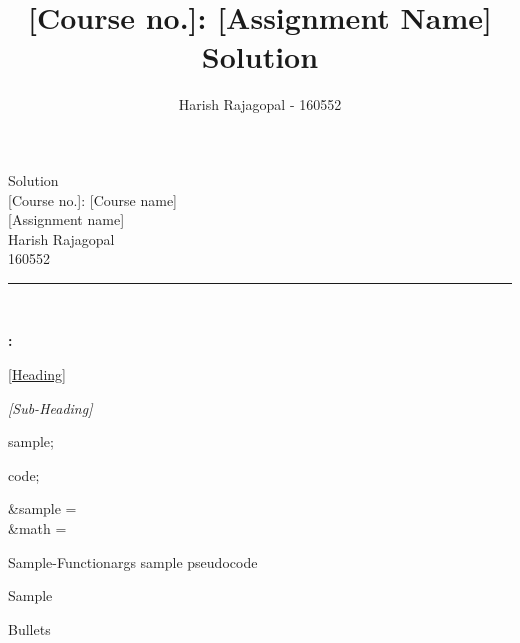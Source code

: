 \documentclass[11pt]{article}
\title{[Course no.]: [Assignment Name] Solution}
\author{Harish Rajagopal - 160552}
\begin{document}
    \setlength{\voffset}{-2mm}
    \setlength{\footskip}{35pt}

    \begin{center}
        \selectfont
        {\huge Solution}\\[+2mm]
        {\Large [Course no.]: [Course name]\\[+2mm]
                [Assignment name]}\\[+3mm]
        {\large Harish Rajagopal\\[+1mm]
                160552}\\[+2mm]
        \rule{45mm}{0.5pt}\\[+9mm]
    \end{center}

    \setlength{\parindent}{8mm}
    \setlength{\parskip}{2mm}

    \noindent\textbf{\fontsize{14}{17}\selectfont [Problem No.]:}\par
        \underline{[Heading]}\par
        \vspace{+1mm}
            \textit{[Sub-Heading]}\par
            \begin{mypar}
            \end{mypar}
            \vspace{+1mm}

            \begin{mycode}
            {
                \item sample;
                \item code;
            }
            \end{mycode}
            \vspace{-6mm}

            \begin{mymath}
                &sample =\\
                &math =
            \end{mymath}
            \vspace{-3mm}

            \begin{mypseudocode}{Sample-Function}{args}
                \State sample
                \State pseudocode
            \end{mypseudocode}

            \begin{myitemize}
                \item Sample\\[-8mm]
                \item Bullets
            \end{myitemize}
\end{document}
